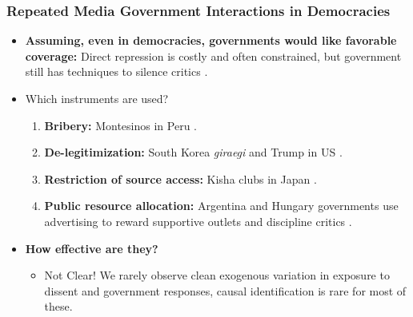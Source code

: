 \documentclass[10pt,aspectratio=169]{beamer}
\begin{document}
\begin{frame}
\frametitle{Repeated Media Government Interactions in Democracies}

\begin{itemize}
 \item \textbf{Assuming, even in democracies, governments would like favorable coverage:}
    Direct repression is costly and often constrained, but government still has techniques to silence critics {\footnotesize\color{gray}\citep{Censor-Pratt-AER}}.
    \vspace{0.2cm}
\item Which instruments are used?

\begin{enumerate}
    \item \textbf{Bribery:} Montesinos in Peru {\footnotesize\color{gray}\citep{Peru-Macmillan-JEP}}.
    \item \textbf{De-legitimization:} South Korea \textit{giraegi} and Trump in US {\footnotesize\color{gray}\citep{KoreaJour-Shin-Journalism, PressCriticism-Carlson-Journalism}}.
    \item \textbf{Restriction of source access:} Kisha clubs in Japan {\footnotesize\color{gray}\citep{Kisha-Freedom}}.
    \item \textbf{Public resource allocation:} Argentina and Hungary governments use \alert{advertising} to \alert{reward} supportive outlets and \alert{discipline} critics {\footnotesize\color{gray}\citep{ArgCorr-DiTella-AEJAE, MediaCaptures-Zeidl-Econometrica}}.
\end{enumerate}

\vspace{0.2cm}
\item \textbf{How effective are they?}
\begin{itemize}
  \item \alert{Not Clear!} We rarely observe clean exogenous variation in exposure to dissent and government responses, causal identification is rare for most of these.
\end{itemize}
\end{itemize}
\end{frame}
\end{document}
